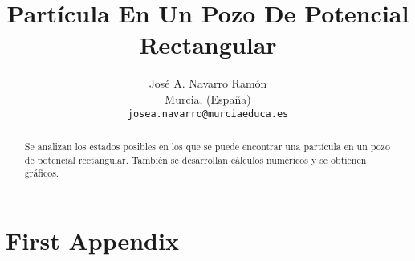 \documentclass[svgnames,a4paper,notitlepage]{report}
\begin{document}
\title{Partícula En Un Pozo De Potencial Rectangular}
\author{José A. Navarro Ramón\\
Murcia, (España)\\
\texttt{josea.navarro@murciaeduca.es}
}

\maketitle

\begin{abstract}
Se analizan los estados posibles en los que se puede encontrar una partícula
en un pozo de potencial rectangular. También se desarrollan cálculos
numéricos y se obtienen gráficos.
\end{abstract}

\tableofcontents






\appendix
\chapter{First Appendix}
\end{document}
